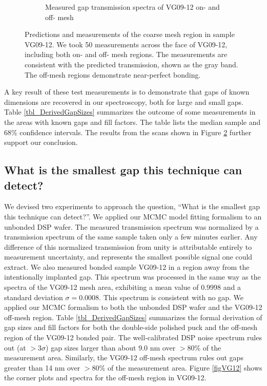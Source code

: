 \documentclass[osajnl,preprint,showpacs,superscriptaddress,12pt]{revtex4-1} %
\begin{document}
\begin{figure}[htbp]
\begin{subfigure}[b]{0.65\textwidth}
        \caption{Measured gap transmission spectra of VG09-12 on- and off- mesh \label{figVG0912}}
    \end{subfigure}
\caption{Predictions and measurements of the coarse mesh region in sample VG09-12.  We took 50 measurements across the face of VG09-12, including both on- and off- mesh regions.  The measurements are consistent with the predicted transmission, shown as the gray band.  The off-mesh regions demonstrate near-perfect bonding.\label{figVG12sta}}
\end{figure}

A key result of these test measurements is to demonstrate that gaps of known dimensions are recovered in our spectroscopy, both for large and small gaps.  Table \ref{tbl_DerivedGapSizes} summarizes the outcome of some measurements in the areas with known gaps and fill factors.  The table lists the median sample and 68\% confidence intervals.  The results from the scans shown in Figure \ref{figVG12sta} further support our conclusion.

\subsection{What is the smallest gap this technique can detect?}
We devised two experiments to approach the question, ``What is the smallest gap this technique can detect?''.  We applied our MCMC model fitting formalism to an unbonded DSP wafer.  The measured transmission spectrum was normalized by a transmission spectrum of the same sample taken only a few minutes earlier.  Any difference of this normalized transmission from unity is attributable entirely to measurement uncertainty, and represents the smallest possible signal one could extract.  We also measured bonded sample VG09-12 in a region away from the intentionally implanted gap.  This spectrum was processed in the same way as the spectra of the VG09-12 mesh area, exhibiting a mean value of 0.9998 and a standard deviation $\sigma=0.0008$.  This spectrum is consistent with no gap.  We applied our MCMC formalism to both the unbonded DSP wafer and the VG09-12 off-mesh region.  Table \ref{tbl_DerivedGapSizes} summarizes the formal derivation of gap sizes and fill factors for both the double-side polished puck and the off-mesh region of the VG09-12 bonded pair.  The well-calibrated DSP noise spectrum rules out (at $>3\sigma$) gap sizes larger than about 9.0 nm over $>80$\% of the measurement area.  Similarly, the VG09-12 off-mesh spectrum rules out gaps greater than 14 nm over $>80$\% of the measurement area.  Figure \ref{figVG12} shows the corner plots and spectra for the off-mesh region in VG09-12.
\end{document}
